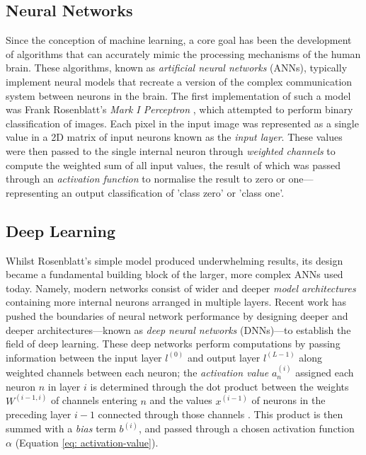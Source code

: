 \documentclass[a4paper, 11pt]{report}
\begin{document}
    \subsection{Neural Networks}

    Since the conception of machine learning, a core goal has been the development of algorithms that can accurately mimic the processing mechanisms of the human brain. These algorithms, known as \emph{artificial neural networks} (ANNs), typically implement neural models that recreate a version of the complex communication system between neurons in the brain. The first implementation of such a model was Frank Rosenblatt's \emph{Mark I Perceptron} \citep{rosenblatt-1958}, which attempted to perform binary classification of images. Each pixel in the input image was represented as a single value in a 2D matrix of input neurons known as the \emph{input layer}. These values were then passed to the single internal neuron through \emph{weighted channels} to compute the weighted sum of all input values,  the result of which was passed through an \emph{activation function} to normalise the result to zero or one—representing an output classification of 'class zero' or 'class one'. 


    \subsection{Deep Learning}
    \label{section: deep-learning}

    Whilst Rosenblatt's simple model produced underwhelming results, its design became a fundamental building block of the larger, more complex ANNs used today. Namely, modern networks consist of wider and deeper \emph{model architectures} containing more internal neurons arranged in multiple layers. Recent work has pushed the boundaries of neural network performance by designing deeper and deeper architectures---known as \emph{deep neural networks} (DNNs)---to establish the field of deep learning. These deep networks perform computations by passing information between the input layer $l^{(0)}$ and output layer $l^{(L-1)}$ along weighted channels between each neuron; the \emph{activation value} $a^{(i)}_n$ assigned each neuron $n$ in layer $i$ is determined through the dot product between the weights $W^{(i-1, i)}$ of channels entering $n$ and the values $x^{(i-1)}$ of neurons in the preceding layer $i-1$ connected through those channels \citep{witten-2017}. This product is then summed with a \emph{bias} term $b^{(i)}$, and passed through a chosen activation function $\alpha$ (Equation \ref{eq: activation-value}).
\end{document}
